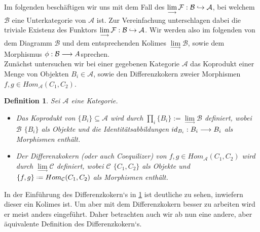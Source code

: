 \documentclass[10pt,a4paper]{report}
\newcounter{Aussage}[chapter]
\newtheorem{definition}[Aussage]{Definition}
\newcommand{\functionfront}[3]{\nolinebreak{#1:#2 \longrightarrow #3}}
\newcommand{\colimes}[0]{\lim\limits_{ \longrightarrow }}
\newcommand{\infunctionfront}[3]{\nolinebreak{#1:#2 \hookrightarrow #3}}
\newcommand*{\defeq}{\mathrel{\vcenter{\baselineskip0.5ex \lineskiplimit0pt
                     \hbox{\scriptsize.}\hbox{\scriptsize.}}}%
                     =}
\begin{document}
Im folgenden beschäftigen wir uns mit dem Fall des $\colimes \infunctionfront{\mathcal{F}}{\mathcal{B}}{\mathcal{A}}$, bei welchem $\mathcal{B}$ eine Unterkategorie von $\mathcal{A}$ ist. Zur Vereinfachung unterschlagen dabei die triviale Existenz des Funktors $\colimes \infunctionfront{\mathcal{F}}{\mathcal{B}}{\mathcal{A}}$. Wir werden also im folgenden von dem Diagramm $\mathcal{B}$ und dem entsprechenden Kolimes $\colimes \mathcal{B}$, sowie dem Morphismus $\functionfront{\phi}{\mathcal{B}}{A} $sprechen.\\ 
Zunächst untersuchen wir bei einer gegebenen Kategorie $\mathcal{A}$ das Koprodukt einer Menge von Objekten $B_i \in \mathcal{A}$, sowie den Differenzkokern zweier Morphismen $f,g \in Hom_{\mathcal{A}}(C_1,C_2)$.

\begin{definition} \label{DifferenzkokernUndKoproduktDef}
Sei $\mathcal{A}$ eine Kategorie.
\begin{itemize}
\item Das Koprodukt von $ \lbrace B_i \rbrace \subseteq \mathcal{A}$ wird durch $\prod_i \lbrace B_i \rbrace := \colimes\mathcal{B}$ definiert, 
wobei $\mathcal{B}$ $\lbrace B_i \rbrace$ als Objekte und die Identitätsabbildungen $\functionfront{id_{B_i}}{B_i}{B_i}$ als Morphismen enthält.
\item Der Differenzkokern (oder auch Coequilizer) von $f,g \in Hom_{\mathcal{A}}(C_1,C_2)$ wird durch $\colimes \mathcal{C}$ definiert,
wobei $\mathcal{C}$ $\lbrace C_1,C_2 \rbrace$ als Objekte und $ \lbrace f,g \rbrace \defeq Hom_{\mathcal{C}}(C_1,C_2)$ als Morphismen enthält.
\end{itemize}
\end{definition}

In der Einführung des Differenzkokern`s in \cref{DifferenzkokernUndKoproduktDef} ist deutliche zu sehen, inwiefern dieser ein Kolimes ist. Um aber mit dem Differenzkokern besser zu arbeiten wird er meist anders eingeführt. Daher betrachten auch wir ab nun eine andere, aber äquivalente Definition des Differenzkokern`s.
\end{document}
